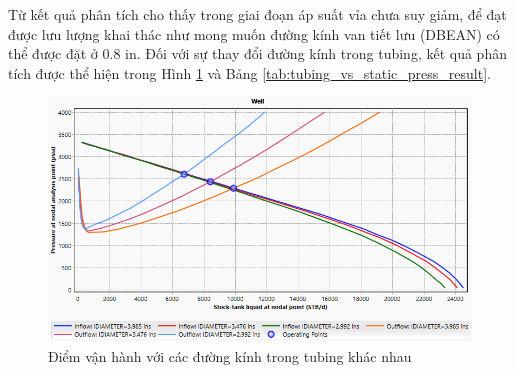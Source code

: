 \documentclass[12pt,a4paper]{report}
\begin{document}
\newline
Từ kết quả phân tích cho thấy trong giai đoạn áp suất vỉa chưa suy giảm, để đạt được lưu lượng khai thác như mong muốn đường kính van tiết lưu (DBEAN) có thể được đặt ở 0.8 in.
\newpage
Đối với sự thay đổi đường kính trong tubing, kết quả phân tích được thể hiện trong Hình \ref{fig:tubing_vs_static_press} và Bảng \ref{tab:tubing_vs_static_press_result}.
	\begin{figure}[h]
		\centering
		\includegraphics[scale=0.75]{Fig/tubing_vs_static_press.PNG}
		\caption{Điểm vận hành với các đường kính trong tubing khác nhau}
		\label{fig:tubing_vs_static_press}
	\end{figure}
\end{document}
